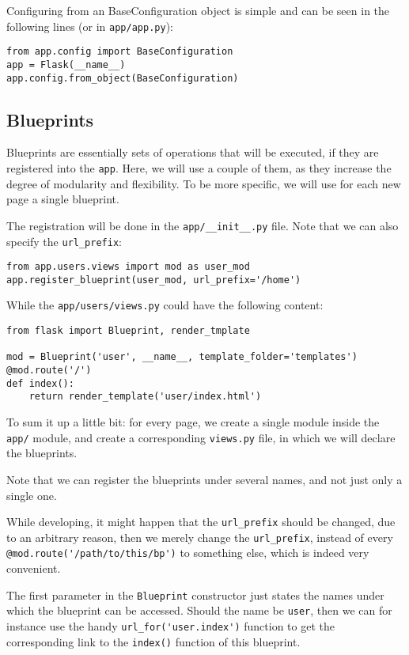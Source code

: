 \documentclass[../main/main.tex]{subfiles}
\begin{document}
Configuring from an BaseConfiguration object is simple and can be seen in the
following lines (or in \lstinline|app/app.py|):

\begin{lstlisting}
from app.config import BaseConfiguration
app = Flask(__name__)
app.config.from_object(BaseConfiguration)
\end{lstlisting}

\subsection{Blueprints}

Blueprints are essentially sets of operations that will be executed,
if they are registered into the \lstinline|app|. Here, we will use a
couple of them, as they increase the degree of modularity and
flexibility. To be more specific, we will use for each new page a
single blueprint. 

The registration will be done in the \lstinline|app/__init__.py|
file. Note that we can also specify the \lstinline|url_prefix|: 

\begin{lstlisting}
from app.users.views import mod as user_mod
app.register_blueprint(user_mod, url_prefix='/home')
\end{lstlisting}

While the \lstinline|app/users/views.py| could have the following
content:

\begin{lstlisting}
from flask import Blueprint, render_tmplate

mod = Blueprint('user', __name__, template_folder='templates')
@mod.route('/')
def index():
    return render_template('user/index.html')
\end{lstlisting}

To sum it up a little bit: for every page, we create a single module
inside the \lstinline|app/| module, and create a corresponding
\lstinline|views.py| file, in which we will declare the blueprints. 

Note that we can register the blueprints under several names, and not
just only a single one. 

While developing, it might happen that the \lstinline|url_prefix|
should be changed, due to an arbitrary reason, then we merely change
the \lstinline|url_prefix|, instead of every
\lstinline|@mod.route('/path/to/this/bp')| to something else, which is
indeed very convenient.

The first parameter in the \lstinline|Blueprint| constructor just
states the names under which the blueprint can be accessed. Should the
name be \lstinline|user|, then we can for instance use the handy
\lstinline|url_for('user.index')| function to get the corresponding
link to the \lstinline|index()| function of this blueprint. 
\end{document}
